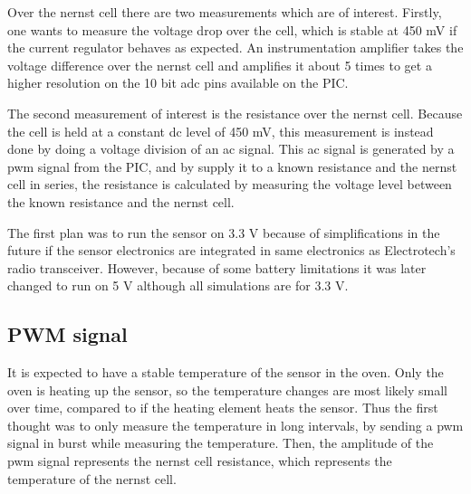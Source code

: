 Over the nernst cell there are two measurements which are of interest. Firstly, one wants to measure the voltage drop over the cell, which is stable at 450 mV if the current regulator behaves as expected. An instrumentation amplifier takes the voltage difference over the nernst cell and amplifies it about 5 times to get a higher resolution on the 10 bit \ac{adc} pins available on the PIC.

The second measurement of interest is the resistance over the nernst cell. Because the cell is held at a constant \ac{dc} level of 450 mV, this measurement is instead done by doing a voltage division of an \ac{ac} signal. This \ac{ac} signal is generated by a \ac{pwm} signal from the PIC, and by supply it to a known resistance and the nernst cell in series, the resistance is calculated by measuring the voltage level between the known resistance and the nernst cell.

The first plan was to run the sensor on 3.3 V because of simplifications in the future if the sensor electronics are integrated in same electronics as Electrotech's radio transceiver. However, because of some battery limitations it was later changed to run on 5 V although all simulations are for 3.3 V.


\subsection{PWM signal}

It is expected to have a stable temperature of the sensor in the oven. Only the oven is heating up the sensor, so the temperature changes are most likely small over time, compared to if the heating element heats the sensor. Thus the first thought was to only measure the temperature in long intervals, by sending a \ac{pwm} signal in burst while measuring the temperature. Then, the amplitude of the \ac{pwm} signal represents the nernst cell resistance, which represents the temperature of the nernst cell.

